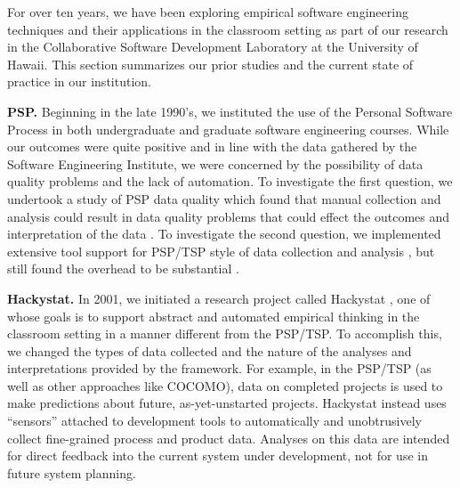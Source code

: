
For over ten years, we have been exploring empirical software engineering
techniques and their applications in the classroom setting as part of our
research in the Collaborative Software Development Laboratory at the
University of Hawaii.  This section summarizes our prior studies and the
current state of practice in our institution.

{\bf PSP.} Beginning in the late 1990's, we instituted the use
of the Personal Software Process in both undergraduate and graduate
software engineering courses.  While our outcomes were quite positive and
in line with the data gathered by the Software Engineering Institute, we
were concerned by the possibility of data quality problems and the lack of
automation.  To investigate the first question, we undertook a study of PSP
data quality which found that manual collection and analysis could result
in data quality problems that could effect the outcomes and interpretation
of the data \citep{csdl-98-13,csdl-98-11}.  To investigate the second question, we
implemented extensive tool support for PSP/TSP style of data collection and
analysis \citep{csdl2-00-03}, but still found the overhead to be
substantial \citep{csdl2-01-12}. 

{\bf Hackystat.} In 2001, we initiated a research project called Hackystat
\citep{csdl2-06-06,csdl2-04-11,csdl2-02-07}, one of whose goals is to
support abstract and automated empirical thinking in the classroom setting
in a manner different from the PSP/TSP.  To accomplish this, we changed the
types of data collected and the nature of the analyses and interpretations
provided by the framework.  For example, in the PSP/TSP (as well as other
approaches like COCOMO), data on completed projects is used to make
predictions about future, as-yet-unstarted projects. Hackystat
instead uses ``sensors'' attached to development tools to automatically and
unobtrusively collect fine-grained process and product data. Analyses on
this data are intended for direct feedback into the current system under
development, not for use in future system planning.

